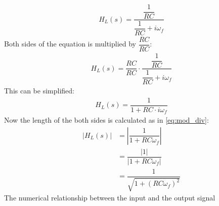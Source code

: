 \begin{align} \label{eq:trans_low}
H_{L}(s) = \dfrac{\dfrac{1}{RC}}{\dfrac{1}{RC}+i \omega_f} 
\end{align}
Both sides of the equation is multiplied by $\dfrac{RC}{RC}$:
\begin{align}
H_{L}(s) = \dfrac{RC}{RC} \cdot \dfrac{\dfrac{1}{RC}}{\dfrac{1}{RC}+i \omega_f} 
\end{align}
This can be simplified:
\begin{align}
H_{L}(s) =  \dfrac{1}{1+RC \cdot i \omega_f} 
\end{align}
Now the length of the both sides is calculated as in \eqref{eq:mod_div}:
\begin{align}
\left|H_{L}(s) \right| &=  \left|\dfrac{1}{1+RC \omega_f} \right| 
\\
&=\dfrac{|1|}{|1+RC\omega_f |}
\\
&=  \dfrac{1}{\sqrt{1+(RC \omega_f)^2}}
\end{align}
The numerical relationship between the input and the output signal 
